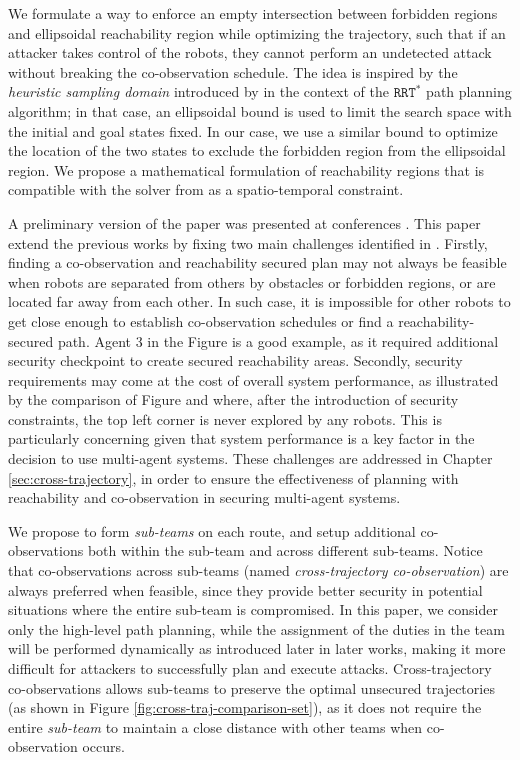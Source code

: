 \documentclass[journal]{IEEEtran}  %
\begin{document}
We formulate a way to enforce an empty intersection between forbidden regions and ellipsoidal reachability region while optimizing the trajectory, such that if an attacker takes control of the robots, they cannot perform an undetected attack without breaking the co-observation schedule.  The idea is inspired by the \emph{heuristic sampling domain} introduced by \cite{gammell2014informed} in the context of the $\mathtt{RRT^*}$ path planning algorithm; in that case, an ellipsoidal bound is used to limit the search space with the initial and goal states fixed. In our case, we use a similar bound to optimize the location of the two states to exclude the forbidden region from the ellipsoidal region. We propose a mathematical formulation of reachability regions that is compatible with the solver from  as a spatio-temporal constraint. 

A preliminary version of the paper was presented at conferences . This paper extend the previous works by fixing two main challenges identified in \cite{wardega2023hola} . Firstly, finding a co-observation and reachability secured plan may not always be feasible when robots are separated from others by obstacles or forbidden regions, or are located far away from each other. In such case, it is impossible for other robots to get close enough to establish co-observation schedules or find a reachability-secured path. Agent 3 in the Figure  is a good example, as it required additional security checkpoint to create secured reachability areas. Secondly, security requirements may come at the cost of overall system performance, as illustrated by the comparison of Figure  and  where, after the introduction of security constraints, the top left corner is never explored by any robots. This is particularly concerning given that system performance is a key factor in the decision to use multi-agent systems. These challenges are addressed in Chapter \ref{sec:cross-trajectory}, in order to ensure the effectiveness of planning with reachability and co-observation in securing multi-agent systems.

We propose to form \emph{sub-teams} on each route, and setup additional co-observations both within the sub-team and across different sub-teams. Notice that co-observations across sub-teams (named \emph{cross-trajectory co-observation}) are always preferred when feasible, since they provide better security in potential situations where the entire sub-team is compromised.
In this paper, we consider only the high-level path planning, while the assignment of the duties in the team will be performed dynamically as introduced later in later works, making it more difficult for attackers to successfully plan and execute attacks. Cross-trajectory co-observations allows sub-teams to preserve the optimal unsecured trajectories (as shown in Figure \ref{fig:cross-traj-comparison-set}), as it does not require the entire \emph{sub-team} to maintain a close distance with other teams when co-observation occurs. 
\end{document}
